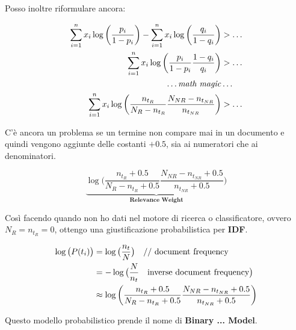 Posso inoltre riformulare ancora:

\begin{align*}
\sum\limits_{i=1}^n x_i \log\bigg( \frac{p_i}{1-p_i} \bigg) - \sum\limits_{i=1}^n x_i \log\bigg( \frac{q_i}{1-q_i} \bigg) &>\ldots \\
\sum\limits_{i=1}^n x_i \log\bigg( \frac{p_i}{1-p_i} \frac{1-q_i}{q_i} \bigg) &> \ldots \\
\ldots \text{\textit{math magic}}& \ldots \\
\sum\limits_{i=1}^n x_i \log\bigg( \frac{n_{t_R}}{N_R - n_{t_R}} \frac{N_{NR} - n_{t_{NR}}}{n_{t_{NR}}} \bigg) &> \ldots
\end{align*}

\noindent C'è ancora un problema se un termine non compare mai in un documento e quindi vengono aggiunte delle costanti $+0.5$, sia ai numeratori che ai denominatori.

$$
\underbrace{\log\bigg( \frac{n_{t_R} + 0.5}{N_R - n_{t_R} + 0.5} \frac{N_{NR} - n_{t_{NR}}+ 0.5}{n_{t_{NR}}+ 0.5} \bigg)}_{\textbf{Relevance Weight}}
$$

\noindent Così facendo quando non ho dati nel motore di ricerca o classificatore, ovvero $N_R = n_{t_R} =0 $, ottengo una giustificazione probabilistica per \textbf{IDF}.

\begin{align*}
\log\big(P(t_i)\big) &= \log\big(\frac{n_t}{N}\big) \text{\quad// document frequency}\\
	&= - \log\big( \frac{N}{n_t}\quad\text{inverse document frequency} \big) \\ 
	&\approx \log\bigg( \frac{n_{t_R} + 0.5}{N_R - n_{t_R} + 0.5} \frac{N_{NR} - n_{t_{NR}}+ 0.5}{n_{t_{NR}}+ 0.5} \bigg) 
\end{align*}


\noindent Questo modello probabilistico prende il nome di \textbf{Binary ... Model}.













